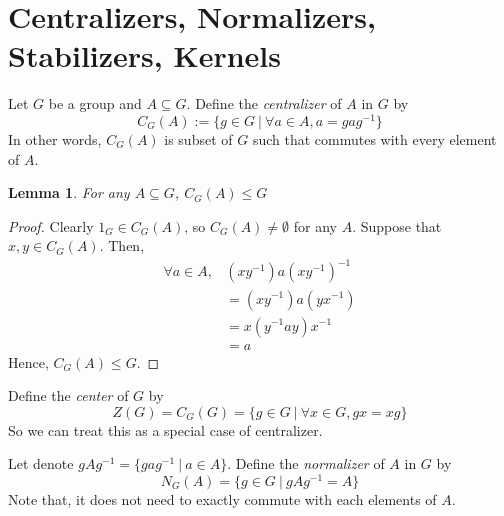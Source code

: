 \documentclass[12pt, a4paper, openany, twoside]{book}
\newtheorem{lem}[thm]{Lemma}
\theoremstyle{definition}
\theoremstyle{remark}
\theoremstyle{plain}
\numberwithin{equation}{section}
\begin{document}
\newpage 

\section{Centralizers, Normalizers, Stabilizers, Kernels}

\begin{tcolorbox}[colback=yellow!10!white,colframe=brown!75!black,title=Centralizer]

Let $G$ be a group and $A \subseteq G$. Define the \textit{centralizer} of $A$ in $G$ by 
\[C_G(A) := \{g \in G ~|~ \forall a \in A, a = gag^{-1}\}\]
In other words, $C_G(A)$ is subset of $G$ such that commutes with every element of $A$.

\end{tcolorbox}

\begin{lem}

For any $A \subseteq G$, $C_G(A) \leq G$

\end{lem}

\begin{proof}
    
Clearly $1_G \in C_G(A)$, so $C_G(A) \neq \emptyset$ for any $A$. Suppose that $x, y \in C_G(A)$. Then, 
\begin{align*}
    \forall a \in A, & (xy^{-1}) a (xy^{-1})^{-1} \\
    & = (xy^{-1})a(yx^{-1}) \\
    &= x (y^{-1}ay) x^{-1} \\
    &= a
\end{align*}
Hence, $C_G(A) \leq G$. 

\end{proof}

\begin{tcolorbox}[colback=yellow!10!white,colframe=brown!75!black,title=Center]

Define the \textit{center} of $G$ by 
\[Z(G) = C_G(G) = \{g \in G ~|~ \forall x \in G, gx = xg \}\]
So we can treat this as a special case of centralizer. 

\end{tcolorbox}

\begin{tcolorbox}[colback=yellow!10!white,colframe=brown!75!black,title=Normalizer]

Let denote $gAg^{-1} = \{gag^{-1}~|~ a \in A\}$. Define the \textit{normalizer} of $A$ in $G$ by 
\[N_G(A) = \{g \in G ~|~ gAg^{-1} = A\}\]
Note that, it does not need to exactly commute with each elements of $A$.

\end{tcolorbox}
\end{document}
